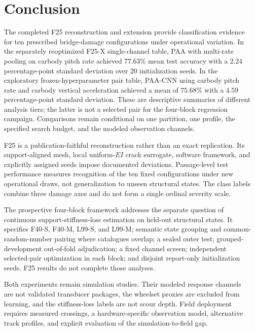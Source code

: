 \section{Conclusion}
\label{sec:conclusion}

The completed F25 reconstruction and extension provide classification evidence
for ten prescribed bridge-damage configurations under operational variation.
In the separately reoptimized F25-X single-channel table, PAA with multi-rate
pooling on carbody pitch rate achieved $77.63\%$ mean test accuracy with a
$2.24$ percentage-point standard deviation over 20 initialization seeds. In the
exploratory frozen-hyperparameter pair table, PAA-CNN using carbody pitch rate
and carbody vertical acceleration achieved a mean of $75.68\%$ with a $4.59$
percentage-point standard deviation. These are descriptive summaries of
different analysis tiers; the latter is not a selected pair for the
four-block regression campaign. Comparisons remain conditional on one
partition, one profile, the specified search budget, and the modeled
observation channels.

F25 is a publication-faithful reconstruction rather than an exact replication.
Its support-aligned mesh, local uniform-$EI$ crack surrogate, software
framework, and explicitly assigned seeds impose documented deviations.
Passage-level test performance measures recognition of the ten fixed
configurations under new operational draws, not generalization to unseen
structural states. The class labels combine three damage axes and do not form
a single ordinal severity scale.

The prospective four-block framework addresses the separate question of
continuous support-stiffness-loss estimation on held-out structural states.
It specifies F40-S, F40-M, L99-S, and L99-M; semantic state grouping and
common-random-number pairing where catalogues overlap; a sealed outer test;
grouped-development out-of-fold adjudication; a fixed channel screen;
independent selected-pair optimization in each block; and disjoint report-only
initialization seeds. F25 results do not complete those analyses.


Both experiments remain simulation studies. Their modeled response channels
are not validated transducer packages, the wheelset proxies are excluded from
learning, and the stiffness-loss labels are not scour depth. Field deployment
requires measured crossings, a hardware-specific observation model, alternative
track profiles, and explicit evaluation of the simulation-to-field gap.
